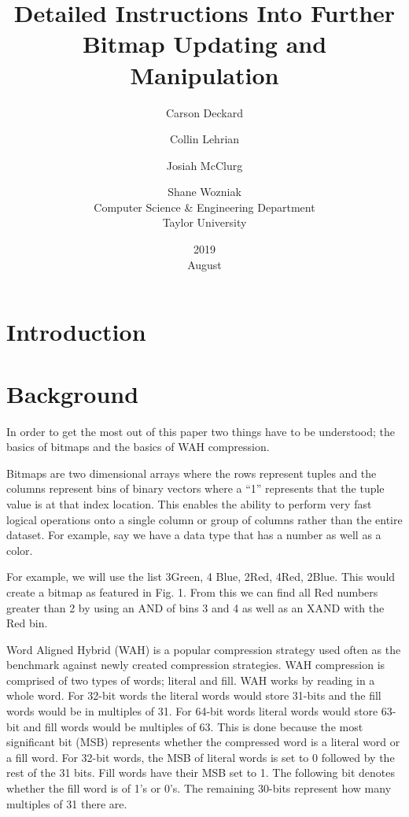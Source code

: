 \documentclass{article}
\title{Detailed Instructions Into Further Bitmap Updating and Manipulation}
\date{2019 \\ August }
\author{Carson Deckard \and Collin Lehrian \and Josiah McClurg \and Shane Wozniak \\ Computer Science & Engineering Department \\ Taylor University}
\begin{document}
\maketitle

%
%
\section{Introduction}
\justify

%
%
\section{Background}
\justify

In order to get the most out of this paper two things have to be understood; the basics of bitmaps and the basics of WAH compression. \par

Bitmaps are two dimensional arrays where the rows represent tuples and the columns represent bins of binary vectors where a “1” represents that the tuple value is at that index location. This enables the ability to perform very fast logical operations onto a single column or group of columns rather than the entire dataset. For example, say we have a data type that has a number as well as a color. \par

For example, we will use the list 3Green, 4 Blue, 2Red, 4Red, 2Blue. This would create a bitmap as featured in Fig. 1. From this we can find all Red numbers greater than 2 by using an AND of bins 3 and 4 as well as an XAND with the Red bin. \par


Word Aligned Hybrid (WAH) is a popular compression strategy used often as the benchmark against newly created compression strategies. WAH compression is comprised of two types of words; literal and fill. WAH works by reading in a whole word. For 32-bit words the literal words would store 31-bits and the fill words would be in multiples of 31. For 64-bit words literal words would store 63-bit and fill words would be multiples of 63. This is done because the most significant bit (MSB) represents whether the compressed word is a literal word or a fill word. For 32-bit words, the MSB of literal words is set to 0 followed by the rest of the 31 bits. Fill words have their MSB set to 1. The following bit denotes whether the fill word is of 1’s or 0’s. The remaining 30-bits represent how many multiples of 31 there are. \par
\end{document}
